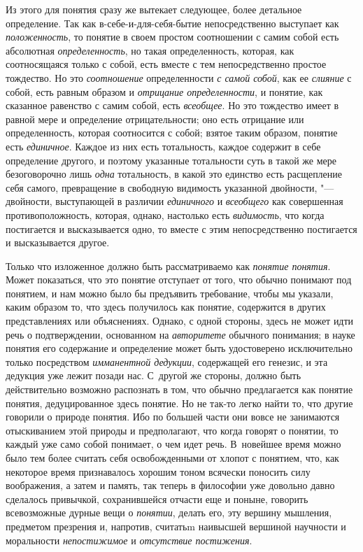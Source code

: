{Из этого для понятия сразу же вытекает следующее, более детальное
определение. Так как в-себе-и-для-себя-бытие непосредственно выступает как
{\em положенность}, то понятие в своем простом соотношении с самим собой есть
абсолютная {\em определенность}, но такая определенность, которая, как
соотносящаяся только с собой, есть вместе с тем непосредственно простое
тождество. Но это {\em соотношение} определенности {\em с самой собой}, как
ее {\em слияние} с собой, есть равным образом и {\em отрицание определенности},
и понятие, как сказанное равенство с самим собой, есть {\em всеобщее}.
Но это тождество имеет в равной мере и определение отрицательности; оно есть
отрицание или определенность, которая соотносится с собой; взятое таким
образом, понятие есть {\em единичное}. Каждое из них есть тотальность, каждое
содержит в себе определение другого, и поэтому указанные тотальности суть в
такой же мере безоговорочно лишь {\em одна} тотальность, в какой это
единство есть расщепление себя самого, превращение в свободную видимость
указанной двойности, "--- двойности, выступающей в различии {\em единичного}
и {\em всеобщего} как совершенная противоположность, которая, однако, настолько
есть {\em видимость}, что когда постигается и высказывается одно, то вместе
с этим непосредственно постигается и высказывается другое.

Только что изложенное должно быть рассматриваемо как {\em понятие понятия}.
Может показаться, что это понятие отступает от того, что обычно понимают под
понятием, и нам можно было бы предъявить требование, чтобы мы указали, каким
образом то, что здесь получилось как понятие, содержится в других
представлениях или объяснениях. Однако, с одной стороны, здесь не может идти
речь о подтверждении, основанном на {\em авторитете} обычного понимания; в
науке понятия его содержание и определение может быть удостоверено
исключительно только посредством {\em имманентной дедукции}, содержащей его
генезис, и эта дедукция уже лежит позади нас. С~другой же стороны, должно
быть действительно возможно распознать в том, что обычно предлагается как
понятие понятия, дедуцированное здесь понятие. Но не так-то легко найти то,
что другие говорили о природе понятия. Ибо по большей части они вовсе не
занимаются отыскиванием этой природы и предполагают, что когда говорят о
понятии, то каждый уже само собой понимает, о чем идет речь. В~новейшее
время можно было тем более считать себя освобожденными от хлопот с понятием,
что, как некоторое время признавалось хорошим тоном всячески поносить силу
воображения, а затем и память, так теперь в философии уже довольно давно
сделалось привычкой, сохранившейся отчасти еще и поныне, говорить
всевозможные дурные вещи о {\em понятии}, делать его, эту вершину мышления,
предметом презрения и, напротив, считатьm наивысшей вершиной научности и
моральности {\em непостижимое} и {\em отсутствие постижения}.

}
